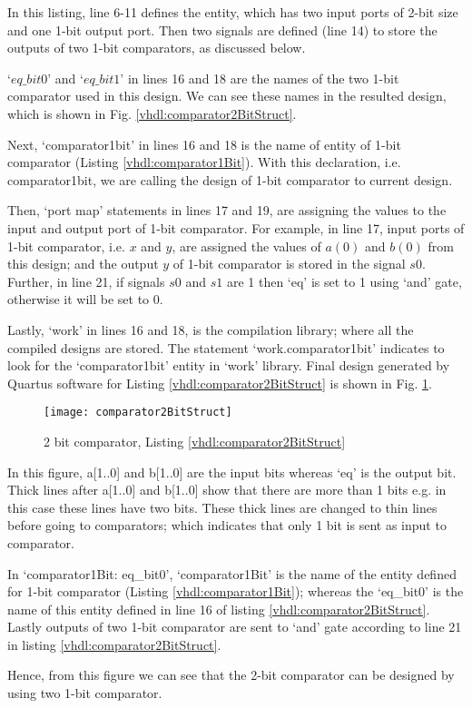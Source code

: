 \begin{explanation}
	In this listing, line 6-11 defines the entity, which has two input ports of 2-bit size and one 1-bit output port. Then two signals are defined (line 14) to store the outputs of two 1-bit comparators, as discussed below.
	
	`$eq\_bit0$' and `$eq\_bit1$' in lines 16 and 18 are the names of the two 1-bit comparator used in this design. We can see these names in the resulted design, which is shown in Fig. \ref{vhdl:comparator2BitStruct}.  
	
	Next, `comparator1bit' in lines 16 and 18 is the name of entity of 1-bit comparator (Listing \ref{vhdl:comparator1Bit}). With this declaration, i.e. comparator1bit, we are calling the design of 1-bit comparator to current design. 
	
	Then, `port map' statements in lines 17 and 19, are assigning the values to the input and output port of 1-bit comparator. For example, in line 17, input ports of 1-bit comparator, i.e. $x$ and $y$, are assigned the values of $a(0)$ and $b(0)$ from this design; and the output $y$ of 1-bit comparator is stored in the signal $s0$. Further, in line 21, if signals $s0$ and $s1$ are 1 then `eq' is set to 1 using `and' gate, otherwise it will be set to 0.
	
	Lastly, `work' in lines 16 and 18, is the compilation library; where all the compiled designs are stored. The statement `work.comparator1bit' indicates to look for the `comparator1bit' entity in `work' library. Final design generated by Quartus software for Listing \ref{vhdl:comparator2BitStruct} is shown in Fig. \ref{fig:comparator2BitStruct}. 
\end{explanation}

\begin{figure}
	\centering
	\texttt{[image: comparator2BitStruct]}
	\caption{2 bit comparator, Listing \ref{vhdl:comparator2BitStruct}}
	\label{fig:comparator2BitStruct}
\end{figure}
\begin{explanation}
	In this figure, a[1..0] and b[1..0]  are the input bits  whereas `eq' is the output bit. Thick lines after a[1..0] and b[1..0] show that there are more than 1 bits e.g. in this case these lines have two bits. These thick lines are changed to thin lines before going to comparators; which indicates that only 1 bit is sent as input to comparator. 
	
	In `comparator1Bit: eq\_bit0', `comparator1Bit' is the name of the entity defined for 1-bit comparator (Listing \ref{vhdl:comparator1Bit}); whereas the `eq\_bit0' is the name of this entity defined in line 16 of listing \ref{vhdl:comparator2BitStruct}. Lastly outputs of two 1-bit comparator are sent to `and' gate according to line 21 in listing \ref{vhdl:comparator2BitStruct}. 
	
	Hence, from this figure we can see that the 2-bit comparator can be designed by using two 1-bit comparator. 
\end{explanation}



